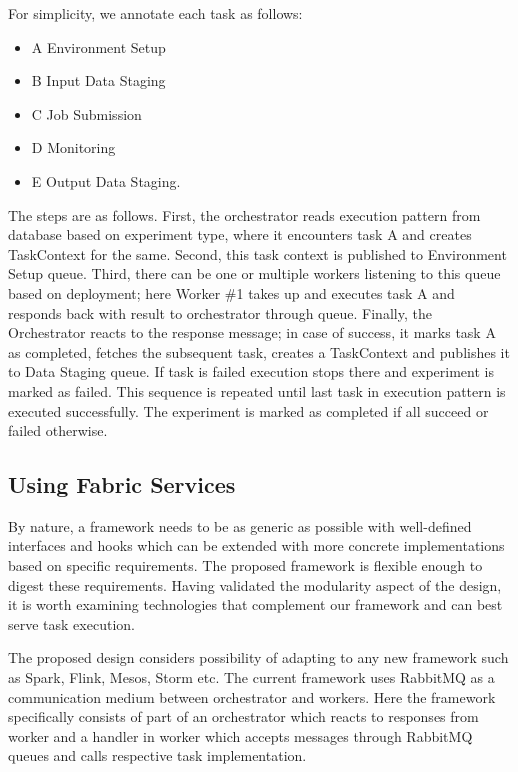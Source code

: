 \documentclass[review]{elsarticle}
\begin{document}
For simplicity, we annotate each task as follows:
\begin{itemize}
\item A  Environment Setup
\item B Input Data Staging
\item C Job Submission
\item D Monitoring
\item E Output Data Staging.
\end{itemize}

The steps are as follows. First, the orchestrator reads execution pattern from database based on experiment type, where it encounters task A and creates TaskContext for the same. Second, this task context is published to Environment Setup queue. Third, there can be one or multiple workers listening to this queue based on deployment; here Worker \#1 takes up and executes task A and responds back with result to orchestrator through queue. Finally, the Orchestrator reacts to the response message; in case of success, it marks task A as completed, fetches the subsequent task, creates a TaskContext and publishes it to Data Staging queue. If task is failed execution stops there and experiment is marked as failed.  This sequence is repeated until last task in execution pattern is executed successfully. The experiment is marked as completed if all succeed or failed otherwise.

\subsection{Using Fabric Services}

By nature, a framework needs to be as generic as possible with well-defined interfaces and hooks which can be extended with more concrete implementations based on specific requirements. The proposed framework is flexible enough to digest these requirements. Having validated the modularity aspect of the design, it is worth examining technologies that complement our framework and can best serve task execution.

The proposed design considers possibility of adapting to any new framework such as Spark, Flink, Mesos, Storm etc. The current framework uses RabbitMQ as a communication medium between orchestrator and workers. Here the framework specifically consists of part of an orchestrator which reacts to responses from worker and a handler in worker which accepts messages through RabbitMQ queues and calls respective task implementation.  
\end{document}
